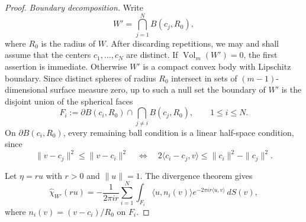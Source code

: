 \documentclass[11pt,reqno,a4paper]{amsart}
\numberwithin{equation}{section}
\theoremstyle{compact}
\theoremstyle{definition}
\theoremstyle{definition}
\newcommand{\Vol}{\operatorname{Vol}}
\begin{document}
\begin{proof}
\smallskip\noindent\emph{Boundary decomposition.}
Write
\begin{equation}\label{eq:cap-equal-ball-intersection}
  W'=\bigcap_{j=1}^N B(c_j,R_0),
\end{equation}
where $R_0$ is the radius of $W$.  After discarding repetitions, we may and
shall assume that the centers $c_1,\ldots,c_N$ are distinct.  If
$\Vol_m(W')=0$, the first assertion is immediate.  Otherwise $W'$ is a
compact convex body with Lipschitz boundary.  Since distinct spheres of radius
$R_0$ intersect in sets of $(m-1)$-dimensional surface measure zero, up to such
a null set the boundary of $W'$ is the disjoint union of the spherical faces
\begin{equation}\label{eq:cap-spherical-faces}
  F_i:=\partial B(c_i,R_0)\cap\bigcap_{j\neq i}B(c_j,R_0),
  \qquad 1\leq i\leq N.
\end{equation}
On $\partial B(c_i,R_0)$, every remaining ball condition is a linear
half-space condition, since
\begin{equation}\label{eq:cap-ball-halfspace-reduction}
  \|v-c_j\|^2\leq\|v-c_i\|^2
  \quad\Longleftrightarrow\quad
  2\langle c_i-c_j,v\rangle
  \leq \|c_i\|^2-\|c_j\|^2.
\end{equation}

Let $\eta=ru$ with $r>0$ and $\|u\|=1$.  The divergence theorem gives
\begin{equation}\label{eq:cap-divergence-fourier}
  \widehat{\chi}_{W'}(ru)
  =-\frac{1}{2\pi i r}
    \sum_{i=1}^N\int_{F_i}
      \langle u,n_i(v)\rangle
      e^{-2\pi i r\langle u,v\rangle}\,dS(v),
\end{equation}
where $n_i(v)=(v-c_i)/R_0$ on $F_i$.


\end{proof}
\end{document}
